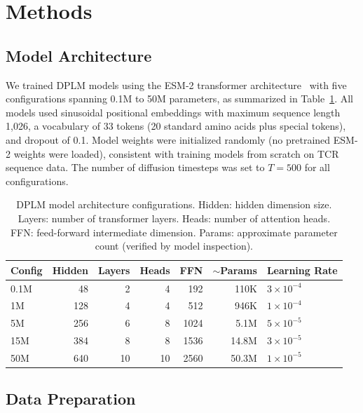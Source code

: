 \documentclass[12pt]{article}
\begin{document}
\section{Methods}

\subsection{Model Architecture}

We trained DPLM models using the ESM-2 transformer architecture~\cite{lin2023} with five
configurations spanning 0.1M to 50M parameters, as summarized in Table~\ref{tab:arch}. All
models used sinusoidal positional embeddings with maximum sequence length 1,026, a vocabulary
of 33 tokens (20 standard amino acids plus special tokens), and dropout of 0.1. Model weights
were initialized randomly (no pretrained ESM-2 weights were loaded), consistent with training
models from scratch on TCR sequence data. The number of diffusion timesteps was set to $T = 500$
for all configurations.

\begin{table}[H]
\centering
\caption{DPLM model architecture configurations. Hidden: hidden dimension size. Layers: number
of transformer layers. Heads: number of attention heads. FFN: feed-forward intermediate
dimension. Params: approximate parameter count (verified by model inspection).}
\label{tab:arch}
\begin{tabular}{lrrrrrl}
\toprule
Config & Hidden & Layers & Heads & FFN & $\sim$Params & Learning Rate \\
\midrule
0.1M & 48  & 2  & 4  & 192  & 110K  & $3 \times 10^{-4}$ \\
1M   & 128 & 4  & 4  & 512  & 946K  & $1 \times 10^{-4}$ \\
5M   & 256 & 6  & 8  & 1024 & 5.1M  & $5 \times 10^{-5}$ \\
15M  & 384 & 8  & 8  & 1536 & 14.8M & $3 \times 10^{-5}$ \\
50M  & 640 & 10 & 10 & 2560 & 50.3M & $1 \times 10^{-5}$ \\
\bottomrule
\end{tabular}
\end{table}

\subsection{Data Preparation}
\end{document}
